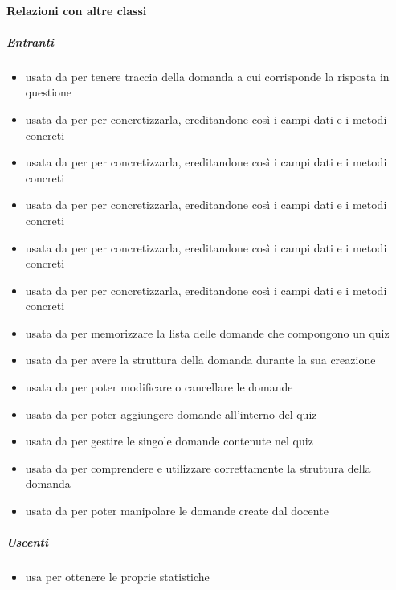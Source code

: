 \paragraph{Relazioni con altre classi}
\subparagraph{Entranti}
\begin{itemize}
\item usata da  per tenere traccia della domanda a cui corrisponde la risposta in questione
\item usata da  per per concretizzarla, ereditandone così i campi dati e i metodi concreti
\item usata da  per per concretizzarla, ereditandone così i campi dati e i metodi concreti
\item usata da  per per concretizzarla, ereditandone così i campi dati e i metodi concreti
\item usata da  per per concretizzarla, ereditandone così i campi dati e i metodi concreti
\item usata da  per per concretizzarla, ereditandone così i campi dati e i metodi concreti
\item usata da  per memorizzare la lista delle domande che compongono un quiz
\item usata da  per avere la struttura della domanda durante la sua creazione
\item usata da  per poter modificare o cancellare le domande
\item usata da  per poter aggiungere domande all'interno del quiz
\item usata da  per gestire le singole domande contenute nel quiz
\item usata da  per comprendere e utilizzare correttamente la struttura della domanda
\item usata da  per poter manipolare le domande create dal docente
\end{itemize}
\subparagraph{Uscenti}
\begin{itemize}
\item usa  per ottenere le proprie statistiche
\end{itemize}
